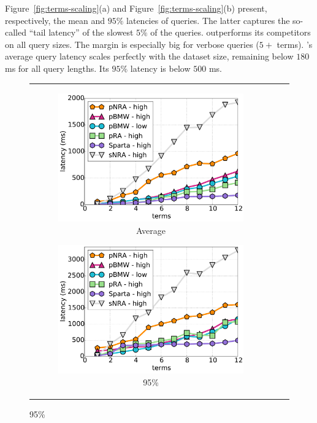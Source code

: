 {Figure~\ref{fig:terms-scaling}(a) and Figure~\ref{fig:terms-scaling}(b) present, respectively, the  mean and  
$95\%$ latencies of queries. The latter captures the so-called ``tail latency'' of 
the slowest $5\%$ of the queries.
%
\alg\/ outperforms its competitors on all query sizes. The margin is especially big for verbose queries
($5+$ terms). \alg's average query latency scales perfectly with the dataset size, 
remaining below $180$ ms for all query lengths.
Its  $95\%$ latency is below $500$ ms. 


\begin{figure}[tbh]
\centering
\begin{tabular}{ccc}
      \begin{subfigure}[t]{0.3\textwidth}
         \includegraphics[width=\textwidth]{figures/latency_12threads_clueweb.pdf}
        \caption[]{Average\bigdataset{, \cw}}
      \end{subfigure}     

	\begin{subfigure}[t]{0.3\textwidth}
    	\includegraphics[width=\textwidth]{figures/latency_95th_percentile_clueweb.pdf}
	\caption{95\%\bigdataset{, \cw}}
    \end{subfigure}  


\end{tabular}
\end{figure}}
